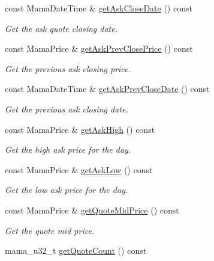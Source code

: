\begin{CompactItemize}
const Mama\-Date\-Time \& \hyperlink{classWombat_1_1MamdaQuoteListener_3454bc5865c264f87778000ed9348f91}{get\-Ask\-Close\-Date} () const 
\begin{CompactList}\small\item\em Get the ask quote closing date. \item\end{CompactList}\item 
const Mama\-Price \& \hyperlink{classWombat_1_1MamdaQuoteListener_e0afe79ab166febbcf94861365dc31c7}{get\-Ask\-Prev\-Close\-Price} () const 
\begin{CompactList}\small\item\em Get the previous ask closing price. \item\end{CompactList}\item 
const Mama\-Date\-Time \& \hyperlink{classWombat_1_1MamdaQuoteListener_58dfc1cbbf19d48e01d51ee715256c15}{get\-Ask\-Prev\-Close\-Date} () const 
\begin{CompactList}\small\item\em Get the previous ask closing date. \item\end{CompactList}\item 
const Mama\-Price \& \hyperlink{classWombat_1_1MamdaQuoteListener_44860382a77a09c7fcca4bcd2e92e1ae}{get\-Ask\-High} () const 
\begin{CompactList}\small\item\em Get the high ask price for the day. \item\end{CompactList}\item 
const Mama\-Price \& \hyperlink{classWombat_1_1MamdaQuoteListener_5c3d63363fd9894fc2949fd769b3af00}{get\-Ask\-Low} () const 
\begin{CompactList}\small\item\em Get the low ask price for the day. \item\end{CompactList}\item 
const Mama\-Price \& \hyperlink{classWombat_1_1MamdaQuoteListener_b74788d3c90fce551bab93ed062a0458}{get\-Quote\-Mid\-Price} () const 
\begin{CompactList}\small\item\em Get the quote mid price. \item\end{CompactList}\item 
mama\_\-u32\_\-t \hyperlink{classWombat_1_1MamdaQuoteListener_85066bf1980233f52a8db81584537edf}{get\-Quote\-Count} () const 

\end{CompactItemize}
